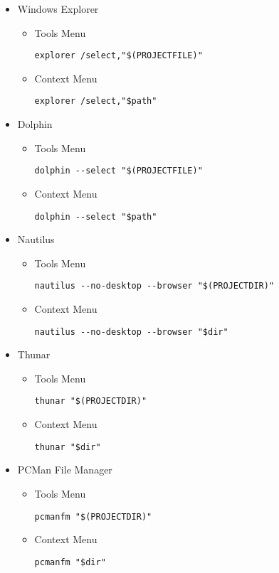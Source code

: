 \begin{itemize}
\item Windows Explorer
\begin{itemize}
\item Tools Menu
\begin{verbatim}
explorer /select,"$(PROJECTFILE)"
\end{verbatim}
\item Context Menu
\begin{verbatim}
explorer /select,"$path"
\end{verbatim}
\end{itemize}

\item Dolphin
\begin{itemize}
\item Tools Menu
\begin{verbatim}
dolphin --select "$(PROJECTFILE)"
\end{verbatim}
\item Context Menu
\begin{verbatim}
dolphin --select "$path"
\end{verbatim}
\end{itemize}


\item Nautilus
\begin{itemize}
\item Tools Menu
\begin{verbatim}
nautilus --no-desktop --browser "$(PROJECTDIR)"
\end{verbatim}
\item Context Menu
\begin{verbatim}
nautilus --no-desktop --browser "$dir"
\end{verbatim}
\end{itemize}

\item Thunar
\begin{itemize}
\item Tools Menu
\begin{verbatim}
thunar "$(PROJECTDIR)"
\end{verbatim}
\item Context Menu
\begin{verbatim}
thunar "$dir"
\end{verbatim}
\end{itemize}

\item PCMan File Manager
\begin{itemize}
\item Tools Menu
\begin{verbatim}
pcmanfm "$(PROJECTDIR)"
\end{verbatim}
\item Context Menu
\begin{verbatim}
pcmanfm "$dir"
\end{verbatim}
\end{itemize}
\end{itemize}

